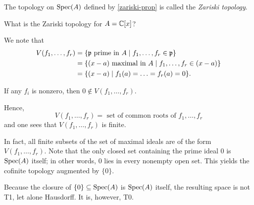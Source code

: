 \begin{df}
  The topology on $\text{Spec}(A)$ defined by \cref{zariski-prop} is called the \textit{Zariski topology}.
\end{df}

\begin{question}
What is the Zariski topology for $A = \mathbb C [x]$?
\end{question}

\begin{answer}
We note that
\begin{align*}
  V(f_1, \ldots, f_r) & = \{ \mathfrak p \text{ prime in } A \mathrel{|} f_1, \dotsc, f_r \in \mathfrak p\} \\
                      & = \{(x-a) \text{ maximal in } A \mathrel{|} f_1, \dotsc, f_r \in (x-a)\} \\
                      & = \{ (x-a) \mathrel{|} f_1(a) = \dotsc = f_r(a) = 0 \}.
\end{align*}

If any $f_i$ is nonzero, then $0 \notin V(f_1, \dotsc, f_r)$.

Hence,
\[ V(f_1, \ldots, f_r) = \text{ set of common roots of }f_1, \ldots, f_r \]
and one sees that $V(f_1, \ldots, f_r)$ is finite.

In fact, all finite subsets of the set of maximal ideals are of the form $V(f_1, \ldots, f_r)$. Note that the only closed set containing the prime ideal $0$ is $\text{Spec}(A)$ itself; in other words, $0$ lies in every nonempty open set. This yields the cofinite topology augmented by $\{0\}$.
\end{answer}

\begin{note}
  Because the closure of $\{0\} \subseteq \text{Spec}(A)$ is $\text{Spec}(A)$ itself, the resulting space is not T1, let alone Hausdorff. It is, however, T0.
\end{note}

